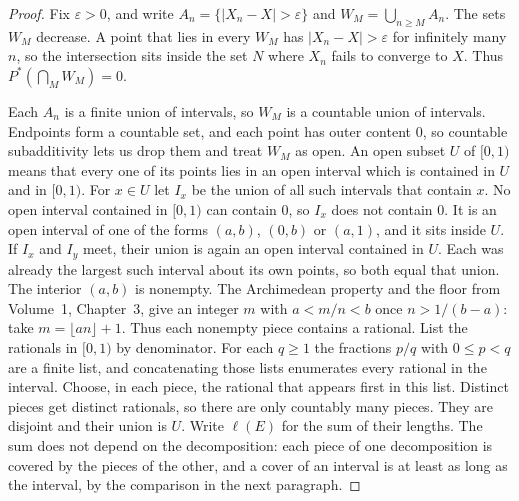 \begin{proof}
Fix $\varepsilon>0$, and write $A_n=\{|X_n-X|>\varepsilon\}$ and $W_M=\bigcup_{n\ge M}A_n$. The sets $W_M$ decrease. A point that lies in every $W_M$ has $|X_n-X|>\varepsilon$ for infinitely many $n$, so the intersection sits inside the set $N$ where $X_n$ fails to converge to $X$. Thus $P^*(\bigcap_M W_M)=0$.

Each $A_n$ is a finite union of intervals, so $W_M$ is a countable union of intervals. Endpoints form a countable set, and each point has outer content $0$, so countable subadditivity lets us drop them and treat $W_M$ as open. An open subset $U$ of $[0,1)$ means that every one of its points lies in an open interval which is contained in $U$ and in $[0,1)$. For $x\in U$ let $I_x$ be the union of all such intervals that contain $x$. No open interval contained in $[0,1)$ can contain $0$, so $I_x$ does not contain $0$. It is an open interval of one of the forms $(a,b)$, $(0,b)$ or $(a,1)$, and it sits inside $U$. If $I_x$ and $I_y$ meet, their union is again an open interval contained in $U$. Each was already the largest such interval about its own points, so both equal that union. The interior $(a,b)$ is nonempty. The Archimedean property and the floor from Volume~1, Chapter~3, give an integer $m$ with $a<m/n<b$ once $n>1/(b-a)$: take $m=\lfloor an\rfloor+1$. Thus each nonempty piece contains a rational. List the rationals in $[0,1)$ by denominator. For each $q\ge1$ the fractions $p/q$ with $0\le p<q$ are a finite list, and concatenating those lists enumerates every rational in the interval. Choose, in each piece, the rational that appears first in this list. Distinct pieces get distinct rationals, so there are only countably many pieces. They are disjoint and their union is $U$. Write $\ell(E)$ for the sum of their lengths. The sum does not depend on the decomposition: each piece of one decomposition is covered by the pieces of the other, and a cover of an interval is at least as long as the interval, by the comparison in the next paragraph.


\end{proof}
